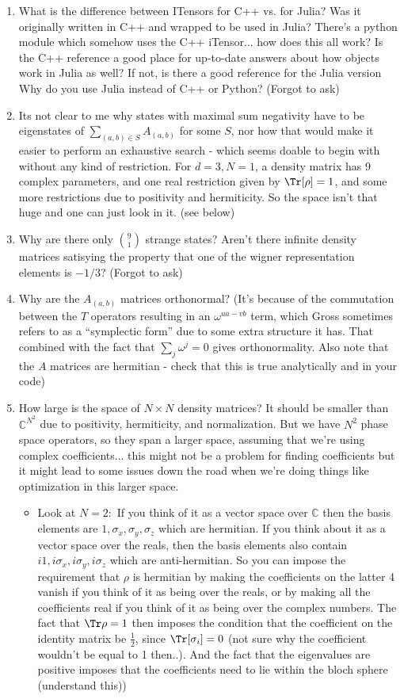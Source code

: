 \documentclass{report}
\begin{document}
 \begin{enumerate}
 \item What is the difference between ITensors for C++ vs. for Julia? Was it originally written in C++ and wrapped to be used in Julia? There's a python module which somehow uses the C++ iTensor... how does this all work? Is the C++ reference a good place for up-to-date answers about how objects work in Julia as well? If not, is there a good reference for the Julia version Why do you use Julia instead of C++ or Python? (\todo Forgot to ask)
 \item Its not clear to me why states with maximal sum negativity have to be eigenstates of $\sum_{(a,b)\in S}A_{(a,b)}$ for some $S$, nor how that would make it easier to perform an exhaustive search - which seems doable to begin with without any kind of restriction. For $d=3, N=1$, a density matrix has 9 complex parameters, and one real restriction given by $\Tr[\rho]=1$, and some more restrictions due to positivity and hermiticity. So the space isn't that huge and one can just look in it. (see below)
 \item Why are there only $\binom{9}{1}$ strange states? Aren't there infinite density matrices satisying the property that one of the wigner representation elements is $-1/3$? (\todo Forgot to ask)
 \item Why are the $A_{(a,b)}$ matrices orthonormal? (It's because of the commutation between the $T$ operators resulting in an $\omega^{ua-vb}$ term, which Gross sometimes refers to as a ``symplectic form'' due to some extra structure it has. That combined with the fact that $\sum_j\omega^j=0$ gives orthonormality. Also note that the $A$ matrices are hermitian - \todo check that this is true analytically and in your code)
 \item How large is the space of $N\times N$ density matrices? It should be smaller than $\mathbb C^{N^2}$ due to positivity, hermiticity, and normalization. But we have $N^2$ phase space operators, so they span a larger space, assuming that we're using complex coefficients... this might not be a problem for finding coefficients but it might lead to some issues down the road when we're doing things like optimization in this larger space. 
 	\begin{itemize}
 	\item Look at $N=2:$ If you think of it as a vector space over $\mathbb C$ then the basis elements are $1,\sigma_x,\sigma_y,\sigma_z$ which are hermitian. If you think about it as a vector space over the reals, then the basis elements also contain $i1,i\sigma_x,i\sigma_y,i\sigma_z$ which are anti-hermitian. So you can impose the requirement that $\rho$ is hermitian by making the coefficients on the latter 4 vanish if you think of it as being over the reals, or by making all the coefficients real if you think of it as being over the complex numbers. The fact that $\Tr\rho=1$ then imposes the condition that the coefficient on the identity matrix be $\frac{1}{2}$, since $\Tr[\sigma_i]=0$ (\todo not sure why the coefficient wouldn't be equal to 1 then..). And the fact that the eigenvalues are positive imposes that the coefficients need to lie within the bloch sphere (\todo understand this))

\end{itemize}
\end{enumerate}
\end{document}
